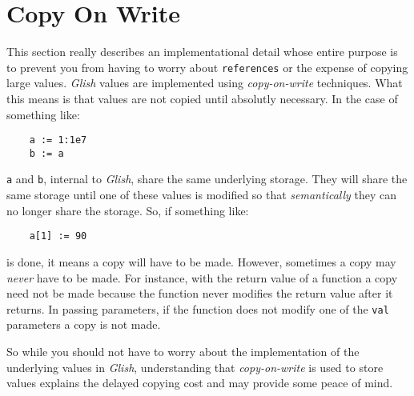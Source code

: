 \section{Copy On Write}
\label{copy-on-write}
This section really describes an implementational detail whose entire
purpose is to prevent you from having to worry about {\tt references}
or the expense of copying large values. {\em Glish} values are implemented 
using {\em copy-on-write}
techniques. What this means is that values are not copied until
absolutly necessary. In the case of something like:
\begin{verbatim}
    a := 1:1e7
    b := a
\end{verbatim}
{\tt a} and {\tt b}, internal to {\em Glish}, share the same underlying storage.
They will share the same storage until one of these values is modified so
that {\em semantically} they can no longer share the storage. So, if something
like:
\begin{verbatim}
    a[1] := 90
\end{verbatim}
is done, it means a copy will have to be made. However, sometimes
a copy may {\em never} have to be made. For instance, 
with the return value of a function
a copy need not be made because the function never modifies
the return value after it returns. In passing parameters, if the function
does not modify one of the {\tt val} parameters a copy is not made.

So while you  should not have to worry about the implementation of the
underlying values in {\em Glish}, understanding that {\em copy-on-write} is used
to store values explains the delayed copying cost and may provide some
peace of mind.
\label{last-type}






